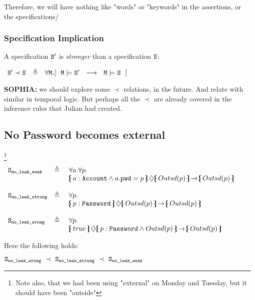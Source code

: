Therefore, we will have nothing like "words" or "keywords" in the assertions, or the specifications/

\subsubsection{Specification Implication}


\begin{definition}
A specification ${\texttt{S}}{'}$ is \emph{stronger} than a specification ${\texttt{S}}{}$:

$\begin{array}{lll}
 \SpecB{'}\prec \SpecB{} & \triangleq &  
 \forall  \Mod . [\ \  \Mod \models \SpecB{'} \ \ \longrightarrow\ \   \Mod  \models \SpecB{}\ \ ]
  \end{array}
$

\end{definition}

\textbf{SOPHIA:} we should explore some $\prec$ relations, in the future. And relate with similar in temporal logic. But perhaps all the $\prec$ are already covered in the inference rules that Julian had created.

\subsection{No Password becomes external}\footnote{Note also, that we had been using "external" on Monday and Tuesday, but it should have been "outside"}

$\begin{array}{lll}
 \Spec{no\_leak\_weak} & \triangleq &  \forall a.  \forall p.\\
 & &   \onlyIf{a:\prg{Account}\wedge a.\prg{pwd}=p}{\outside{p}} {\outside{p}}\   
~ \\
\\
 \Spec{no\_leak\_strong} & \triangleq &  \forall p.\\
 & &   \onlyIf{p:\prg{Password}} {\outside{p}} {\outside{p}}\  \\
 ~ \\
 \Spec{no\_leak\_wrong} & \triangleq\ & \forall p. \\
 & &    \onlyIf{true} {p:\prg{Password} \wedge \outside{p}} {\outside{p}} 

\end{array}
$

\vspace{.1in}
\noindent
Here the following holds:

$\Spec{no\_leak\_wrong}  \ \prec\ \Spec{no\_leak\_strong}  \ \prec \ \Spec{no\_leak\_weak} $

